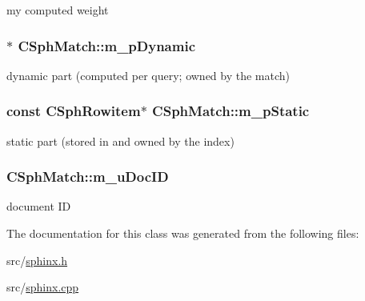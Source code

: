 my computed weight 

\hypertarget{classCSphMatch_a0ed856b2f6cff288cda3e0a682a87ca5}{
\subsubsection[{m\-\_\-p\-Dynamic}]{$\ast$ C\-Sph\-Match\-::m\-\_\-p\-Dynamic}}\label{classCSphMatch_a0ed856b2f6cff288cda3e0a682a87ca5}


dynamic part (computed per query; owned by the match) 

\hypertarget{classCSphMatch_af83f609543b1dd0546fcb6ddf417495d}{
\subsubsection[{m\-\_\-p\-Static}]{\setlength{\rightskip}{0pt plus 5cm}const {\bf C\-Sph\-Rowitem}$\ast$ C\-Sph\-Match\-::m\-\_\-p\-Static}}\label{classCSphMatch_af83f609543b1dd0546fcb6ddf417495d}


static part (stored in and owned by the index) 

\hypertarget{classCSphMatch_a7998712d1849c157ffd02a395de4ad65}{
\subsubsection[{m\-\_\-u\-Doc\-I\-D}]{ C\-Sph\-Match\-::m\-\_\-u\-Doc\-I\-D}}\label{classCSphMatch_a7998712d1849c157ffd02a395de4ad65}


document I\-D 



The documentation for this class was generated from the following files\-:\begin{DoxyCompactItemize}
\item 
src/\hyperlink{sphinx_8h}{sphinx.\-h}\item 
src/\hyperlink{sphinx_8cpp}{sphinx.\-cpp}\end{DoxyCompactItemize}
